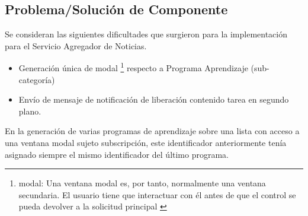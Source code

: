 \subsection{Problema/Soluci\'{o}n de Componente}

Se consideran las siguientes dificultades que surgieron para la implementaci\'{o}n
para el Servicio Agregador de Noticias.

\begin{itemize}

\item Generaci\'{o}n \'{u}nica de modal \footnote{modal: Una ventana modal es, 
por tanto, normalmente una ventana secundaria. El usuario tiene que interactuar
con \'{e}l antes de que el control se pueda devolver a la solicitud principal
\cite{modal}} respecto a Programa Aprendizaje (sub-categor\'{i}a)
\item Env\'{i}o de mensaje de notificaci\'{o}n de liberaci\'{o}n contenido tarea
en segundo plano. 

\end{itemize}

En la generaci\'{o}n de varias programas de aprendizaje sobre una lista con acceso a
una ventana modal sujeto subscripci\'{o}n, este identificador anteriormente
ten\'{i}a asignado siempre el mismo identificador del \'{u}ltimo programa.

